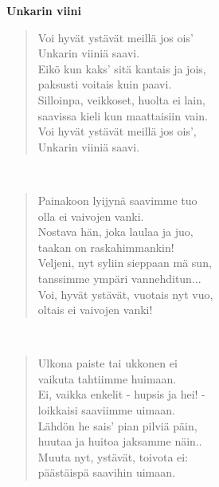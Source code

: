 %
%
\noindent\begin{minipage}{\linewidth}
\vspace{5pt}
\parbox[t]{0.85\linewidth}{\raggedright {\large\bf Unkarin viini}\\[6pt]}
\begin{verse}
	Voi hyvät ystävät meillä jos ois'\\
	Unkarin viiniä saavi.\\
	Eikö kun kaks' sitä kantais ja jois,\\
	paksusti voitais kuin paavi.\\
	Silloinpa, veikkoset, huolta ei lain,\\
	saavissa kieli kun maattaisiin vain.\\
	Voi hyvät ystävät meillä jos ois',\\
	Unkarin viiniä saavi.\\
\end{verse}
\end{minipage}\\[10pt]
\noindent\begin{minipage}{\linewidth}
\begin{verse}
	Painakoon lyijynä saavimme tuo\\
	olla ei vaivojen vanki.\\
	Nostava hän, joka laulaa ja juo,\\
	taakan on raskahimmankin!\\
	Veljeni, nyt syliin sieppaan mä sun,\\
	tanssimme ympäri vannehditun...\\
	Voi, hyvät ystävät, vuotais nyt vuo,\\
	oltais ei vaivojen vanki!\\
\end{verse}
\end{minipage}\\[10pt]
\noindent\begin{minipage}{\linewidth}
\begin{verse}
	Ulkona paiste tai ukkonen ei\\
	vaikuta tahtiimme huimaan.\\
	Ei, vaikka enkelit - hupsis ja hei! -\\
	loikkaisi saaviimme uimaan.\\
	Lähdön he sais' pian pilviä päin,\\
	huutaa ja huitoa jaksamme näin..\\
	Muuta nyt, ystävät, toivota ei:\\
	päästäispä saavihin uimaan.\\
\end{verse}
\end{minipage}\\[10pt]
